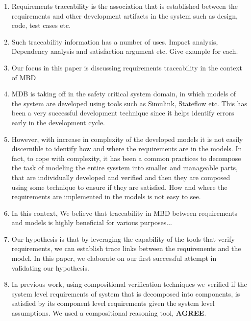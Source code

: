 
\begin{enumerate}

  \item Requirements traceability is the association that is established between the requirements and other development artifacts in the system such as design, code, test cases etc.

  \item Such traceability information has a number of uses. Impact analysis, Dependency analysis and satisfaction argument etc. Give example for each.

  \item Our focus in this paper is discussing requirements traceability in the context of MBD

  \item MDB is taking off in the safety critical system domain, in which models of the system are developed using tools such as Simulink, Stateflow etc. This has been a very successful development technique since it helps identify errors early in the development cycle.

  \item However, with increase in complexity of the developed models it is not easily discernible to identify how and where the requirements are in the models. In fact, to cope with complexity, it has been a common practices to decompose the task of modeling the entire sysstem into smaller and manageable parts, that are individually developed and verified and then they are composed using some technique to ensure if they are satisfied. How and where the requirements are implemented in the models is not easy to see.

  \item In this context, We believe that traceability in MBD between requirements and models is highly beneficial for various purposes...

  \item Our hypothesis is that by leveraging the capability of the tools that verify requirements, we can establish trace links between the requirements and the model. In this paper, we elaborate on our first successful attempt in validating our hypothesis.

  \item In previous work, using compositional verification techniques we verified if the system level requirements of system that is decomposed into components, is satisfied by its component level requirements given the system level assumptions. We used a compositional reasoning tool, \textbf{AGREE}.


\end{enumerate}
